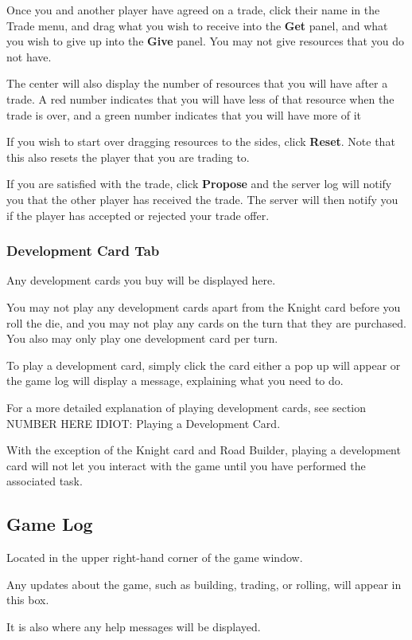 \documentclass[12pt,letterpaper,titlepage]{article}
\begin{document}
		Once you and another player have agreed on a trade, click their name in the Trade menu, and drag what you wish to receive into the \textbf{Get} panel, and what you wish to give up into the \textbf{Give} panel. You may not give resources that you do not have.
		
		The center will also display the number of resources that you will have after a trade. A red number indicates that you will have less of that resource when the trade is over, and a green number indicates that you will have more of it 
		
		If you wish to start over dragging resources to the sides, click \textbf{Reset}. Note that this also resets the player that you are trading to.
		
		If you are satisfied with the trade, click \textbf{Propose} and the server log will notify you that the other player has received the trade. The server will then notify you if the player has accepted or rejected your trade offer.
		
		\subsubsection{Development Card Tab}
		Any development cards you buy will be displayed here.
		
		You may not play any development cards apart from the Knight card before you roll the die, and you may not play any cards on the turn that they are purchased. You also may only play one development card per turn.
		
		To play a development card, simply click the card either a pop up will appear or the game log will display a message, explaining what you need to do.
		
		For a more detailed explanation of playing development cards, see section NUMBER HERE IDIOT: Playing a Development Card.
		
		With the exception of the Knight card and Road Builder, playing a development card will not let you interact with the game until you have performed the associated task.
	
	\subsection{Game Log}
	Located in the upper right-hand corner of the game window.
	
	Any updates about the game, such as building, trading, or rolling, will appear in this box.
	
	It is also where any help messages will be displayed.
	
\end{document}
